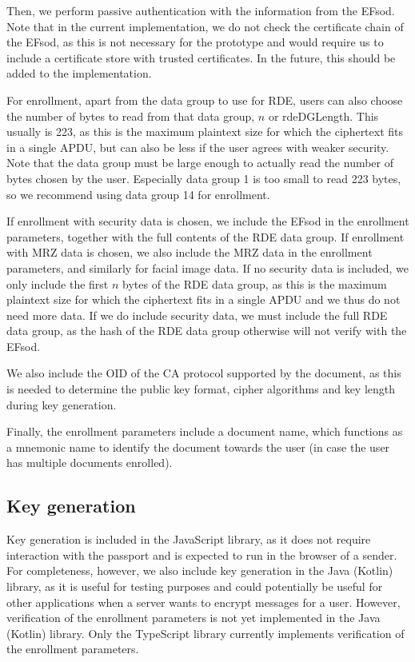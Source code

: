 Then, we perform passive authentication with the information from the EFsod.
Note that in the current implementation, we do not check the certificate chain of the EFsod, as this is not necessary for the prototype and would require us to include a certificate store with trusted certificates.
In the future, this should be added to the implementation.

For enrollment, apart from the data group to use for RDE, users can also choose the number of bytes to read from that data group, $n$ or \textsf{rdeDGLength}.
This usually is 223, as this is the maximum plaintext size for which the ciphertext fits in a single APDU, but can also be less if the user agrees with weaker security.
Note that the data group must be large enough to actually read the number of bytes chosen by the user.
Especially data group 1 is too small to read 223 bytes, so we recommend using data group 14 for enrollment.

If enrollment with security data is chosen, we include the EFsod in the enrollment parameters, together with the full contents of the RDE data group.
If enrollment with MRZ data is chosen, we also include the MRZ data in the enrollment parameters, and similarly for facial image data.
If no security data is included, we only include the first $n$ bytes of the RDE data group, as this is the maximum plaintext size for which the ciphertext fits in a single APDU and we thus do not need more data.
If we do include security data, we must include the full RDE data group, as the hash of the RDE data group otherwise will not verify with the EFsod.

We also include the OID of the CA protocol supported by the document, as this is needed to determine the public key format, cipher algorithms and key length during key generation.

Finally, the enrollment parameters include a document name, which functions as a mnemonic name to identify the document towards the user (in case the user has multiple documents enrolled).

\subsection{Key generation}\label{subsec:key-generation}
Key generation is included in the JavaScript library, as it does not require interaction with the passport and is expected to run in the browser of a sender.
For completeness, however, we also include key generation in the Java (Kotlin) library, as it is useful for testing purposes and could potentially be useful for other applications when a server wants to encrypt messages for a user.
However, verification of the enrollment parameters is not yet implemented in the Java (Kotlin) library.
Only the TypeScript library currently implements verification of the enrollment parameters.

